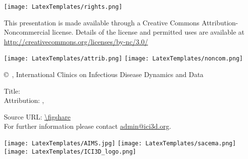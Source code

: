 
\begin{frame}[plain]

\begin{centering}

\texttt{[image: LatexTemplates/rights.png]}

\vfill

{
	\tiny\linespread{12}
	This presentation is made available through a Creative Commons Attribution-Noncommercial license.
	Details of the license and permitted uses are available at \url{http://creativecommons.org/licenses/by-nc/3.0/} \par
}

\medskip
\texttt{[image: LatexTemplates/attrib.png]}
\hspace{3em}
\texttt{[image: LatexTemplates/noncom.png]}
\medskip

{\scriptsize\copyright\ \years, International Clinics on Infectious Disease Dynamics and Data}

\vfill

{\footnotesize
	Title: \inserttitle \\
	Attribution: \insertauthor, \insertdate 
	\par
}

\bigskip

{
	\scriptsize Source URL: \url{\figshare} \\
	For further information please contact \url{admin@ici3d.org}.
	\par
}

\vfill

\texttt{[image: LatexTemplates/AIMS.jpg]}
\hfill
\texttt{[image: LatexTemplates/sacema.png]}
\hfill
\texttt{[image: LatexTemplates/ICI3D\_logo.png]}

\end{centering}

\end{frame}
